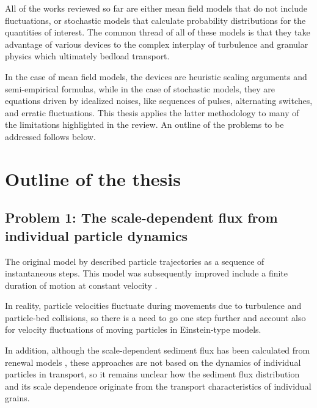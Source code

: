 All of the works reviewed so far are either mean field models that do not include fluctuations, or stochastic models that calculate probability distributions for the quantities of interest.
The common thread of all of these models is that they take advantage of various devices to \DIFdelbegin {}\DIFdelend \DIFaddbegin {}\DIFaddend the complex interplay of turbulence and granular physics which ultimately \DIFdelbegin {}\DIFdelend \DIFaddbegin {}\DIFaddend bedload transport.

In the case of mean field models, the devices are heuristic scaling arguments and semi-empirical formulas, while in the case of stochastic models, they are \DIFdelbegin {}\DIFdelend \DIFaddbegin {}\DIFaddend equations driven by idealized noises, like sequences of pulses, alternating switches, and erratic fluctuations.
This thesis applies the latter methodology to many of the limitations highlighted in the review. An outline of the problems to be addressed follows below.

\section{Outline of the thesis}
\subsection{Problem 1: The scale-dependent flux from individual particle dynamics}

The original model by \citet{Einstein1937} described particle trajectories as a sequence of instantaneous steps. This model was subsequently improved \DIFaddbegin {}\DIFaddend include a finite duration of motion at constant velocity \citep{Lisle1998,Lajeunesse2017}.

In reality, particle velocities fluctuate during movements due to turbulence and particle-bed collisions, so there is a need to go one step further and account also for \DIFaddbegin {}\DIFaddend velocity fluctuations of moving particles in Einstein-type models.

In addition, although the scale-dependent sediment flux has been calculated from renewal models \DIFdelbegin {}\DIFdelend \DIFaddbegin {}\DIFaddend , these approaches are not based on the dynamics of individual particles in transport, so it remains unclear how the sediment flux distribution and its scale dependence originate from the transport characteristics of individual grains.

